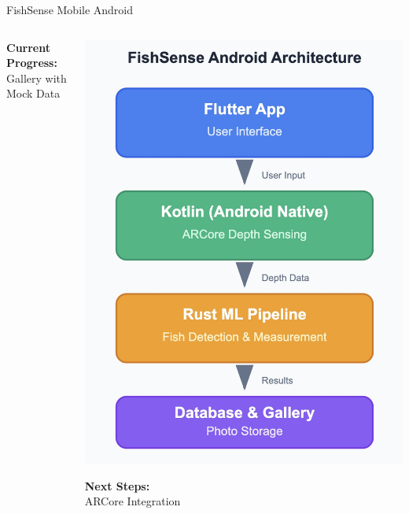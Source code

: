 \begin{frame}{FishSense Mobile Android}
\begin{columns}
\begin{column}{0.32\textwidth}
            \vspace{0.2cm}
            \textbf{Current Progress:} \\
            Gallery with Mock Data
        \end{column}
        
        \begin{column}{0.32\textwidth}
            \centering
            \includegraphics[height=0.7\textheight,keepaspectratio]{images/Diagram1.jpg}
            
            \vspace{0.1cm}
            \textbf{Next Steps:} \\
            ARCore Integration
        \end{column}
    \end{columns}
    \vfill
\end{frame}

